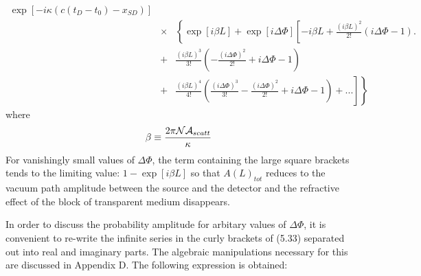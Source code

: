\documentclass [12pt]{article}
\begin{document}
{\begin{eqnarray}
   \exp\left[ - i \kappa\left(c(t_D-t_0)-x_{SD}\right)\right] \nonumber \\
        & \times & \left\{ \exp[i\beta L] + \exp[i\Delta \Phi]\left[ -i\beta L +
       \frac{(i\beta L)^2}{2!}\left(i\Delta \Phi-1\right).\right.\right. \nonumber \\
        & + & \frac{(i\beta L)^3}{3!}\left(-\frac{(i\Delta \Phi)^2}{2!}
        + i\Delta \Phi-1\right)  \nonumber \\
        & + & \left .\left .  \frac{(i\beta L)^4}{4!} \left(\frac{(i\Delta \Phi)^3}{3!}
         -\frac{(i\Delta \Phi)^2}{2!} 
        + i\Delta \Phi-1\right)+ ...  \right] \right \}
   \end{eqnarray}
      where 
      \begin{equation}
      \beta \equiv \frac{ 2 \pi {\cal N}{\cal A}_{scatt}}{\kappa}
  \end{equation}
    For vanishingly small values of $\Delta \Phi$,
    the term containing the large square brackets tends to the limiting value:
    $1-\exp[i\beta L]$ so that $ A(L)_{tot}$ reduces to the vacuum path amplitude
    between the source and the detector and the refractive effect of the block of
    transparent medium disappears.
    \par In order to discuss the probability amplitude  for arbitary values of
   $\Delta \Phi$, it is convenient to re-write the infinite series in the curly
   brackets of (5.33) separated out into real and imaginary parts. The algebraic manipulations
   necessary for this are discussed in Appendix D. The following expression
   is obtained:
    
}
\end{document}
